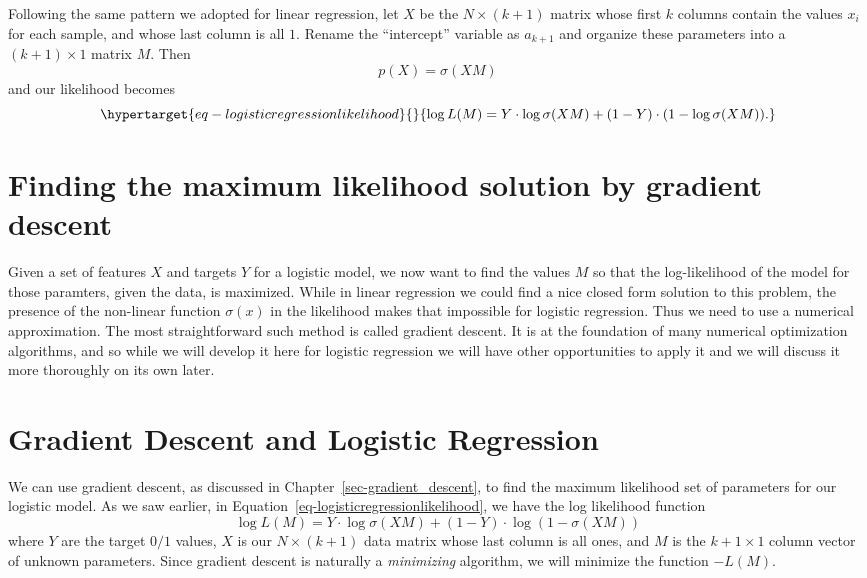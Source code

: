 \documentclass[
  11pt,
  letterpaper,
]{scrbook}
\theoremstyle{plain}
\theoremstyle{plain}
\theoremstyle{remark}
\begin{document}
Following the same pattern we adopted for linear regression, let \(X\)
be the \(N\times (k+1)\) matrix whose first \(k\) columns contain the
values \(x_i\) for each sample, and whose last column is all \(1\).
Rename the ``intercept'' variable as \(a_{k+1}\) and organize these
parameters into a \((k+1)\times 1\) matrix \(M\). Then \[
p(X)=\sigma(XM)
\] and our likelihood becomes
\begin{equation}\protect\hypertarget{eq-logisticregressionlikelihood}{}{
\log L(M) = Y\cdot \log\sigma(XM) + (1-Y)\cdot(1-\log\sigma(XM)).
}\label{eq-logisticregressionlikelihood}\end{equation}

\hypertarget{finding-the-maximum-likelihood-solution-by-gradient-descent}{%
\section{Finding the maximum likelihood solution by gradient
descent}\label{finding-the-maximum-likelihood-solution-by-gradient-descent}}

Given a set of features \(X\) and targets \(Y\) for a logistic model, we
now want to find the values \(M\) so that the log-likelihood of the
model for those paramters, given the data, is maximized. While in linear
regression we could find a nice closed form solution to this problem,
the presence of the non-linear function \(\sigma(x)\) in the likelihood
makes that impossible for logistic regression. Thus we need to use a
numerical approximation. The most straightforward such method is called
gradient descent. It is at the foundation of many numerical optimization
algorithms, and so while we will develop it here for logistic regression
we will have other opportunities to apply it and we will discuss it more
thoroughly on its own later.

\hypertarget{gradient-descent-and-logistic-regression}{%
\section{Gradient Descent and Logistic
Regression}\label{gradient-descent-and-logistic-regression}}

We can use gradient descent, as discussed in
Chapter~\ref{sec-gradient_descent}, to find the maximum likelihood set
of parameters for our logistic model. As we saw earlier, in
Equation~\ref{eq-logisticregressionlikelihood}, we have the log
likelihood function \[
\log L(M) = Y\cdot \log\sigma(XM) + (1-Y)\cdot\log(1-\sigma(XM))
\] where \(Y\) are the target \(0/1\) values, \(X\) is our
\(N\times (k+1)\) data matrix whose last column is all ones, and \(M\)
is the \(k+1\times 1\) column vector of unknown parameters. Since
gradient descent is naturally a \emph{minimizing} algorithm, we will
minimize the function \(-L(M)\).
\end{document}

